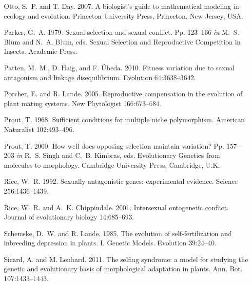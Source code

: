 \documentclass{article}
\begin{document}
\begin{thebibliography}{}
Otto, S.~P. and T. Day. 2007.
\newblock A biologist's guide to mathematical modeling in ecology and evolution.
\newblock Princeton University Press, Princeton, New Jersey, USA.

Parker, G.~A. 1979.
\newblock Sexual selection and sexual conflict.
\newblock Pp. 123--166 \textit{in} M.~S. Blum and N.~A. Blum, eds. Sexual Selection and Reproductive Competition in Insects. Academic Press.

Patten, M.~M., D. Haig, and F. \'{U}beda. 2010.
\newblock Fitness variation due to sexual antagonism and linkage disequilibrium.
\newblock Evolution 64:3638--3642.

Porcher, E. and R. Lande. 2005.
\newblock Reproductive compensation in the evolution of plant mating systems.
\newblock New Phytologist 166:673--684.

Prout, T. 1968.
\newblock Sufficient conditions for multiple niche polymorphism.
\newblock American Naturalist 102:493--496.

Prout, T. 2000.
\newblock How well does opposing selection maintain variation?
\newblock Pp. 157--203 \textit{in} R.~S. Singh and C.~B. Kimbras, eds. Evolutionary Genetics from molecules to morphology. Cambridge University Press, Cambridge, U.K.

Rice, W.~R. 1992.
\newblock Sexually antagonistic genes: experimental evidence.
\newblock Science 256:1436--1439.

Rice, W.~R. and A.~K. Chippindale. 2001.
\newblock Intersexual ontogenetic conflict.
\newblock Journal of evolutionary biology 14:685--693.

Schemske, D.~W. and R. Lande. 1985.
\newblock The evolution of self-fertilization and inbreeding depression in plants. I. Genetic Models.
\newblock Evolution 39:24--40.

Sicard, A. and M. Lenhard. 2011.
\newblock The selfing syndrome: a model for studying the genetic and evolutionary basis of morphological adaptation in plants.
\newblock Ann. Bot. 107:1433--1443.


\end{thebibliography}
\end{document}

